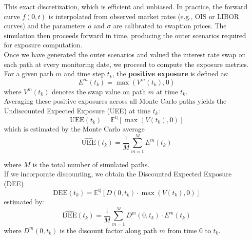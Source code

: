     \noindent
    This exact discretization, which is efficient and unbiased.  In practice, the forward curve \(f(0,t)\) is interpolated from observed market rates (e.g., OIS or LIBOR curves) and the parameters \(a\) and \(\sigma\) are calibrated to swaption prices.  The simulation then proceeds forward in time, producing the outer scenarios required for exposure computation.\\

    \noindent
    Once we have generated the outer scenarios and valued the interest rate swap on each path at every monitoring date, we proceed to compute the exposure metrics. For a given path \(m\) and time step \(t_k\), the \textbf{positive exposure} is defined as:
    \begin{equation}
        E^m(t_k) = \max(V^m(t_k), 0)
        \label{eq:positive_exposure}
    \end{equation}
    where \(V^m(t_k)\) denotes the swap value on path \(m\) at time \(t_k\). \\
    
    \noindent
    Averaging these positive exposures across all Monte Carlo paths yields the Undiscounted Expected Exposure (UEE) at time \(t_k\):
    \begin{equation}
        \text{UEE}(t_k) = \mathbb{E}^\mathbb{Q}[\max(V(t_k), 0)]
        \label{eq:uee}
    \end{equation}
    which is estimated by the Monte Carlo average
    \begin{equation}
        \widehat{\text{UEE}}(t_k) = \frac{1}{M} \sum_{m=1}^{M} E^m(t_k)
        \label{eq:uee_estimate}
    \end{equation}

    \noindent
    where \(M\) is the total number of simulated paths.\\

    \noindent
    If we incorporate discounting, we obtain the Discounted Expected Exposure (DEE)
    \begin{equation}
        \text{DEE}(t_k) = \mathbb{E}^\mathbb{Q}[D(0, t_k) \cdot \max(V(t_k), 0)]
        \label{eq:dee}
    \end{equation}
    estimated by:
    \begin{equation}
        \widehat{\text{DEE}}(t_k) = \frac{1}{M} \sum_{m=1}^{M} D^m(0, t_k) \cdot E^m(t_k)
        \label{eq:dee_estimate}
    \end{equation}
    where \(D^m(0, t_k)\) is the discount factor along path \(m\) from time \(0\) to \(t_k\). \\

